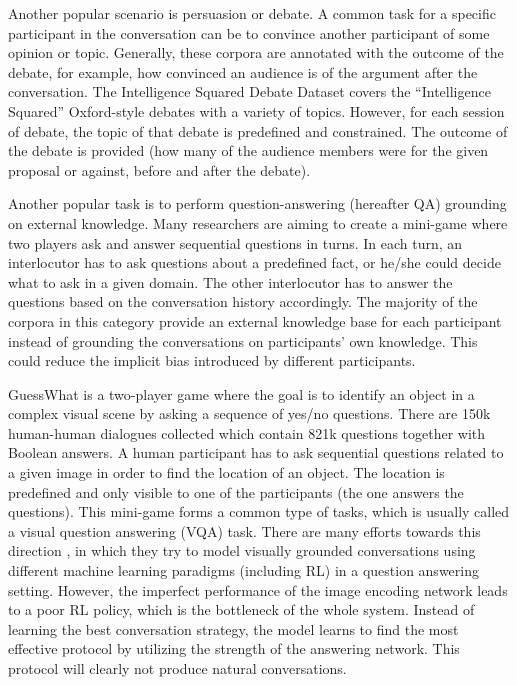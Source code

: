 \documentclass[bsc,frontabs,twoside,singlespacing,parskip,deptreport]{infthesis}     %
\begin{document}
Another popular scenario is persuasion or debate. A common task for a specific participant in the conversation can be to convince another participant of some opinion or topic. Generally, these corpora are annotated with the outcome of the debate, for example, how convinced an audience is of the argument after the conversation. The Intelligence Squared Debate Dataset \cite{zhang2016conversational} covers the “Intelligence Squared” Oxford-style debates with a variety of topics. However, for each session of debate, the topic of that debate is predefined and constrained. The outcome of the debate is provided (how many of the audience members were for the given proposal or against, before and after the debate).

Another popular task is to perform question-answering (hereafter QA) grounding on external knowledge. Many researchers are aiming to create a mini-game where two players ask and answer sequential questions in turns. In each turn, an interlocutor has to ask questions about a predefined fact, or he/she could decide what to ask in a given domain. The other interlocutor has to answer the questions based on the conversation history accordingly. The majority of the corpora in this category provide an external knowledge base for each participant instead of grounding the conversations on participants' own knowledge. This could reduce the implicit bias introduced by different participants.

GuessWhat \cite{de2017guesswhat} is a two-player game where the goal is to identify an object in a complex visual scene by asking a sequence of yes/no questions. There are 150k human-human dialogues collected which contain 821k questions together with Boolean answers. A human participant has to ask sequential questions related to a given image in order to find the location of an object. The location is predefined and only visible to one of the participants (the one answers the questions). This mini-game forms a common type of tasks, which is usually called a visual question answering (VQA) task. There are many efforts towards this direction \cite{strub2017end,shekhar2017foil,reddy2019coqa,zhou2018dataset,de2017guesswhat,das2017visual,das2017learning}, in which they try to model visually grounded conversations using different machine learning paradigms (including RL) in a question answering setting. However, the imperfect performance of the image encoding network leads to a poor RL policy, which is the bottleneck of the whole system. Instead of learning the best conversation strategy, the model learns to find the most effective protocol by utilizing the strength of the answering network. This protocol will clearly not produce natural conversations.
\end{document}
